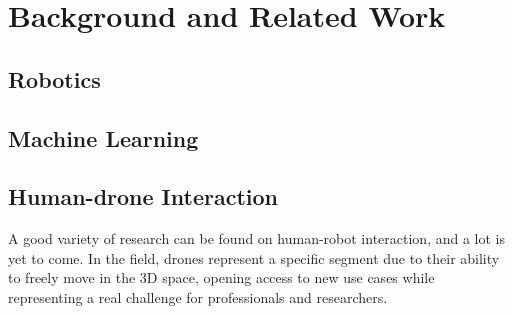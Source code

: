 \chapter{Background and Related Work}
\label{chap:theory}




\section{Robotics}
\label{sec:robotics}

%




\section{Machine Learning}
\label{sec:machine-learning}

%
%




\section{Human-drone Interaction}
\label{sec:human-drone-interaction}

A good variety of research can be found on human-robot interaction, and a lot is yet to come. In the field, drones represent a specific segment due to their ability to freely move in the 3D space, opening access to new use cases while representing a real challenge for professionals and researchers.

